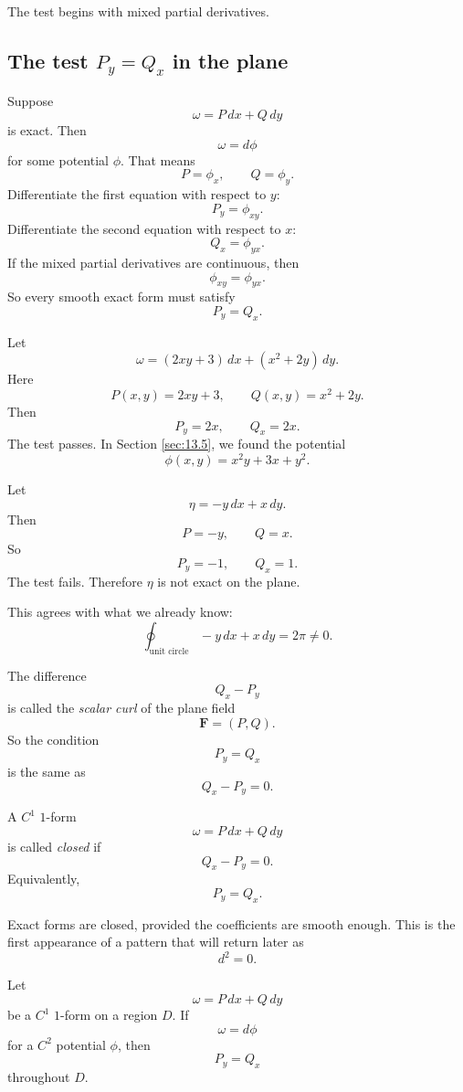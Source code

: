 The test begins with mixed partial derivatives.

\subsection{The test \texorpdfstring{\(P_y=Q_x\)}{Py = Qx} in the plane}

Suppose
\[
    \omega=P\,dx+Q\,dy
\]
is exact.  Then
\[
    \omega=d\phi
\]
for some potential \(\phi\).  That means
\[
    P=\phi_x,
    \qquad
    Q=\phi_y.
\]
Differentiate the first equation with respect to \(y\):
\[
    P_y=\phi_{xy}.
\]
Differentiate the second equation with respect to \(x\):
\[
    Q_x=\phi_{yx}.
\]
If the mixed partial derivatives are continuous, then
\[
    \phi_{xy}=\phi_{yx}.
\]
So every smooth exact form must satisfy
\[
\boxed{
    P_y=Q_x.
}
\]

\begin{example}
Let
\[
    \omega=(2xy+3)\,dx+(x^2+2y)\,dy.
\]
Here
\[
    P(x,y)=2xy+3,
    \qquad
    Q(x,y)=x^2+2y.
\]
Then
\[
    P_y=2x,
    \qquad
    Q_x=2x.
\]
The test passes.  In Section \ref{sec:13.5}, we found the potential
\[
    \phi(x,y)=x^2y+3x+y^2.
\]
\end{example}

\begin{example}
Let
\[
    \eta=-y\,dx+x\,dy.
\]
Then
\[
    P=-y,
    \qquad
    Q=x.
\]
So
\[
    P_y=-1,
    \qquad
    Q_x=1.
\]
The test fails.  Therefore \(\eta\) is not exact on the plane.

This agrees with what we already know:
\[
    \oint_{\text{unit circle}} -y\,dx+x\,dy=2\pi\ne0.
\]
\end{example}

The difference
\[
    Q_x-P_y
\]
is called the \emph{scalar curl} of the plane field
\[
    \mathbf F=(P,Q).
\]
So the condition
\[
    P_y=Q_x
\]
is the same as
\[
\boxed{
    Q_x-P_y=0.
}
\]

\begin{definition}
A \(C^1\) \(1\)-form
\[
    \omega=P\,dx+Q\,dy
\]
is called \emph{closed} if
\[
\boxed{
    Q_x-P_y=0.
}
\]
Equivalently,
\[
    P_y=Q_x.
\]
\end{definition}

Exact forms are closed, provided the coefficients are smooth enough.  This is the
first appearance of a pattern that will return later as
\[
    d^2=0.
\]

\begin{theorem}
Let
\[
    \omega=P\,dx+Q\,dy
\]
be a \(C^1\) \(1\)-form on a region \(D\).  If
\[
    \omega=d\phi
\]
for a \(C^2\) potential \(\phi\), then
\[
\boxed{
    P_y=Q_x
}
\]
throughout \(D\).
\end{theorem}

